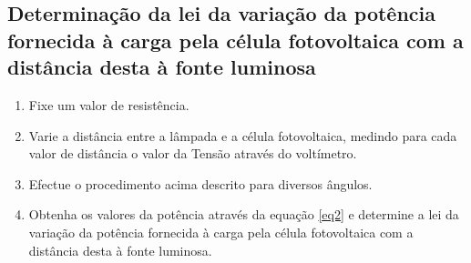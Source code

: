 \documentclass[10pt]{extarticle}
\begin{document}
\begin{multicols}{2}
\subsection{Determinação da lei da variação da potência fornecida à carga pela célula fotovoltaica com a distância desta à fonte luminosa}

\begin{enumerate}
\item Fixe um valor de resistência.
\item Varie a distância entre a lâmpada e a célula fotovoltaica, medindo para cada valor de distância o valor da Tensão através do voltímetro.
\item Efectue o procedimento acima descrito para diversos ângulos. 
\item Obtenha os valores da potência através da equação \eqref{eq2} e determine a lei da variação da potência fornecida à carga pela célula fotovoltaica com a distância desta à fonte luminosa.
\end{enumerate}









\end{multicols}
\end{document}
